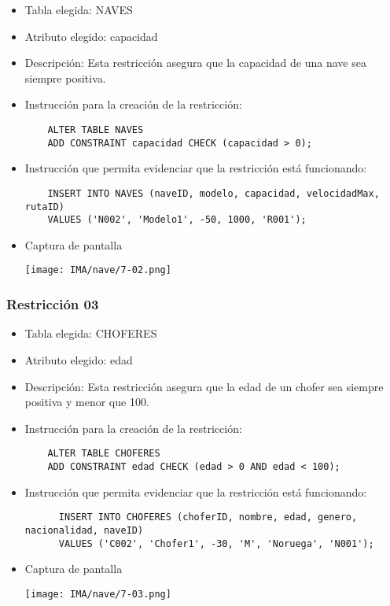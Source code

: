 \begin{itemize} 
  \item Tabla elegida: NAVES 
  \item Atributo elegido: capacidad 
  \item Descripción: Esta restricción asegura que la capacidad de una nave sea siempre positiva. 
  \item Instrucción para la creación de la restricción: 
    \begin{verbatim}
    ALTER TABLE NAVES 
    ADD CONSTRAINT capacidad CHECK (capacidad > 0); 
    \end{verbatim} 
  \item Instrucción que permita evidenciar que la restricción está funcionando: 
    \begin{verbatim} 
    INSERT INTO NAVES (naveID, modelo, capacidad, velocidadMax, rutaID) 
    VALUES ('N002', 'Modelo1', -50, 1000, 'R001'); 
    \end{verbatim} 
    
  \item Captura de pantalla 
    \begin{center} 
      \texttt{[image: IMA/nave/7-02.png]}
    \end{center} 
\end{itemize}


\subsubsection*{Restricción 03}

\begin{itemize} 
  \item Tabla elegida: CHOFERES 
  \item Atributo elegido: edad 
  \item Descripción: Esta restricción asegura que la edad de un chofer sea siempre positiva y menor que 100. 
  \item Instrucción para la creación de la restricción: 
    \begin{verbatim} 
    ALTER TABLE CHOFERES
    ADD CONSTRAINT edad CHECK (edad > 0 AND edad < 100); 
    \end{verbatim} 
  \item Instrucción que permita evidenciar que la restricción está funcionando: 
    \begin{verbatim}
      INSERT INTO CHOFERES (choferID, nombre, edad, genero, nacionalidad, naveID) 
      VALUES ('C002', 'Chofer1', -30, 'M', 'Noruega', 'N001');
    \end{verbatim} 
  \item Captura de pantalla 
    \begin{center}
      \texttt{[image: IMA/nave/7-03.png]}
    \end{center} 
\end{itemize}


